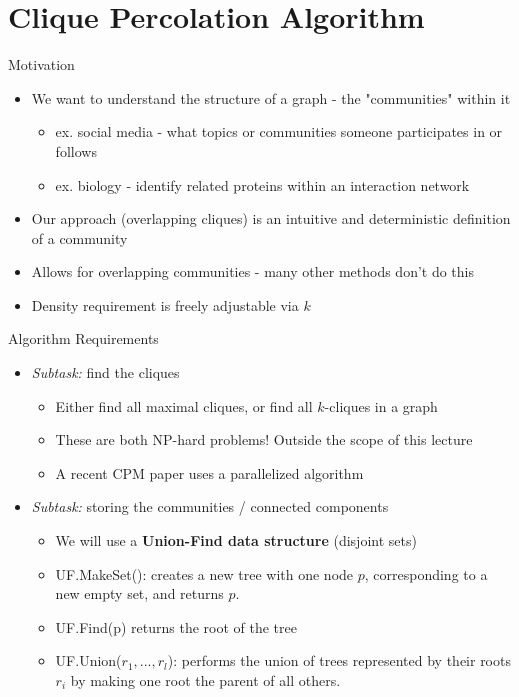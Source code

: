 \documentclass[aspectratio=169, handout]{beamer}
\begin{document}
\section{Clique Percolation Algorithm}
\frame{\sectionpage}

\begin{frame}{Motivation}
\begin{itemize}
\item We want to understand the structure of a graph - the "communities" within it
\begin{itemize}
\item ex. social media - what topics or communities someone participates in or follows
\item ex. biology - identify related proteins within an interaction network
\end{itemize}
\pause
\item Our approach (overlapping cliques) is an intuitive and deterministic definition of a community
\item Allows for overlapping communities - many other methods don't do this
\item Density requirement is freely adjustable via $k$
\end{itemize}
\end{frame}

\begin{frame}{Algorithm Requirements}
\begin{itemize}
\item \textit{Subtask:} find the cliques
\begin{itemize}
\item Either find all maximal cliques, or find all $k$-cliques in a graph
\item These are both NP-hard problems! Outside the scope of this lecture
\item A recent CPM paper uses a parallelized algorithm \cite{KClique}
\end{itemize}
\pause
\item \textit{Subtask:} storing the communities / connected components
\begin{itemize}
\item We will use a \textbf{Union-Find data structure} (disjoint sets)
\item UF.MakeSet(): creates a new tree with one node $p$, corresponding to a new empty
set, and returns $p$.
\item UF.Find(p) returns the root of the tree
\item UF.Union($r_1, ..., r_l$): performs the union of trees represented by their roots $r_i$ by making one root the parent of all others.
\end{itemize}
\end{itemize}
\end{frame}
\end{document}
